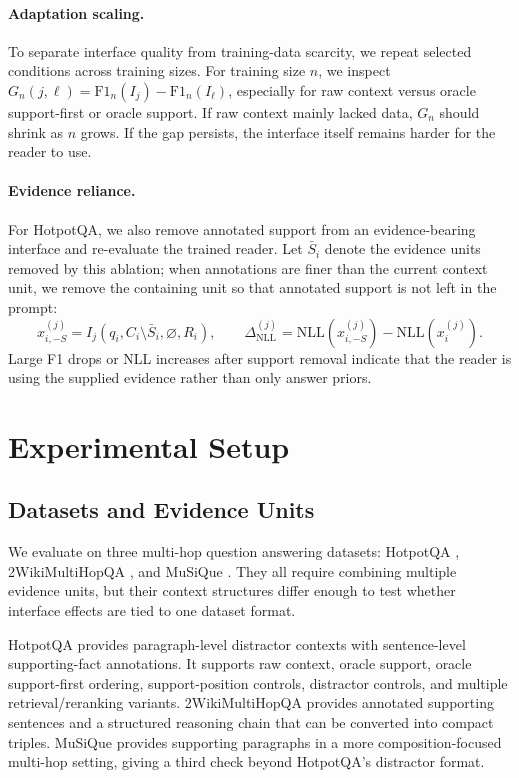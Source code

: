 \documentclass[a4paper,fleqn]{cas-sc}
\begin{document}
\paragraph{Adaptation scaling.}
To separate interface quality from training-data scarcity, we repeat selected
conditions across training sizes. For training size $n$, we inspect
$G_n(j,\ell)=\mathrm{F1}_n(I_j)-\mathrm{F1}_n(I_\ell)$, especially for raw
context versus oracle support-first or oracle support. If raw context mainly
lacked data, $G_n$ should shrink as $n$ grows. If the gap persists, the
interface itself remains harder for the reader to use.

\paragraph{Evidence reliance.}
For HotpotQA, we also remove annotated support from an evidence-bearing
interface and re-evaluate the trained reader. Let $\bar{S}_i$ denote the
evidence units removed by this ablation; when annotations are finer than the
current context unit, we remove the containing unit so that annotated support is
not left in the prompt:
\begin{equation}
x_{i,-S}^{(j)} = I_j(q_i, C_i \setminus \bar{S}_i, \varnothing, R_i),
\qquad
\Delta_{\mathrm{NLL}}^{(j)}
= \mathrm{NLL}(x_{i,-S}^{(j)})-\mathrm{NLL}(x_i^{(j)}).
\label{eq:reliance}
\end{equation}
Large F1 drops or NLL increases after support removal indicate that the reader
is using the supplied evidence rather than only answer priors.

\section{Experimental Setup}

\subsection{Datasets and Evidence Units}

We evaluate on three multi-hop question answering datasets: HotpotQA
\citep{yang2018hotpotqa}, 2WikiMultiHopQA \citep{ho2020twowiki}, and MuSiQue
\citep{trivedi2022musique}. They all require combining multiple evidence units,
but their context structures differ enough to test whether interface effects
are tied to one dataset format.

HotpotQA provides paragraph-level distractor contexts with sentence-level
supporting-fact annotations. It supports raw context, oracle support,
oracle support-first ordering, support-position controls, distractor controls,
and multiple retrieval/reranking variants. 2WikiMultiHopQA provides annotated
supporting sentences and a structured reasoning chain that can be converted
into compact triples. MuSiQue provides supporting paragraphs in a more
composition-focused multi-hop setting, giving a third check beyond HotpotQA's
distractor format.
\end{document}
